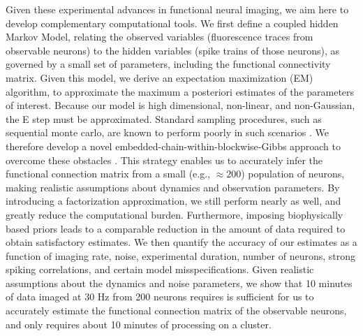 Given these experimental advances in functional neural imaging, we aim here to develop complementary computational tools.  We first define a coupled hidden Markov Model, relating the observed variables (fluorescence traces from observable neurons) to the hidden variables (spike trains of those neurons), as governed by a small set of parameters, including the functional connectivity matrix.  Given this model, we derive an expectation maximization (EM) algorithm, to approximate the maximum a posteriori estimates of the parameters of interest.  Because our model is high dimensional, non-linear, and non-Gaussian, the E step must be approximated.  Standard sampling procedures, such as sequential monte carlo, are known to perform poorly in such scenarios \cite{DGL01}.  We therefore develop a novel embedded-chain-within-blockwise-Gibbs approach to overcome these obstacles \cite{Neal03}. This strategy enables us to accurately infer the functional connection matrix from a small (e.g., $\approx 200$) population of neurons, making realistic assumptions about dynamics and observation parameters.  By introducing a factorization approximation, we still perform nearly as well, and greatly reduce the computational burden.  Furthermore, imposing biophysically based priors leads to a comparable reduction in the amount of data required to obtain satisfactory estimates.  We then quantify the accuracy of our estimates as a function of imaging rate, noise, experimental duration, number of neurons, strong spiking correlations, and certain model misspecifications.  Given realistic assumptions about the dynamics and noise parameters, we show that 10 minutes of data imaged at 30 Hz from 200 neurons requires is sufficient for us to accurately estimate the functional connection matrix of the observable neurons, and only requires about 10 minutes of processing on a cluster.  